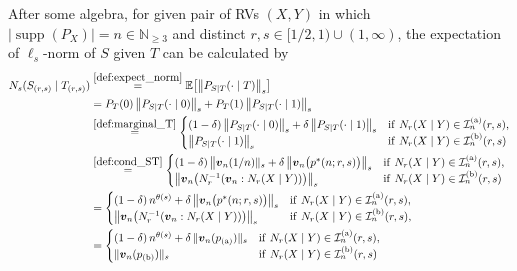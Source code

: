 \documentclass[conference, draftcls, onecolumn]{IEEEtran}
\theoremstyle{plain}
\newcommand{\bvec}[1]{\boldsymbol{#1}}
\newcommand{\supp}{\operatorname{supp}}
\begin{document}
After some algebra, for given pair of RVs $(X, Y)$ in which $|\!\supp( P_{X} )| = n \in \mathbb{N}_{\ge 3}$ and distinct $r, s \in [1/2, 1) \cup (1, \infty)$, the expectation of $\ell_{s}$-norm of $S$ given $T$ can be calculated by
\begin{align}
N_{s}(S_{(r, s)} \mid T_{(r, s)})
& \overset{\eqref{def:expect_norm}}{=}
\mathbb{E}\big[ \big\| P_{S|T}(\cdot \mid T) \big\|_{s} \big]
\\
& =
P_{T}( 0 ) \, \big\| P_{S|T}(\cdot \mid 0) \big\|_{s} + P_{T}( 1 ) \, \big\| P_{S|T}(\cdot \mid 1) \big\|_{s}
\\
& \overset{\eqref{def:marginal_T}}{=}
\begin{cases}
(1-\delta) \, \big\| P_{S|T}(\cdot \mid 0) \big\|_{s} + \delta \, \big\| P_{S|T}(\cdot \mid 1) \big\|_{s}
& \mathrm{if} \ N_{r}(X \mid Y) \in \mathcal{I}_{n}^{(\mathrm{a})}( r, s ) ,
\\
\big\| P_{S|T}(\cdot \mid 1) \big\|_{s}
& \mathrm{if} \ N_{r}(X \mid Y) \in \mathcal{I}_{n}^{(\mathrm{b})}( r, s )
\end{cases}
\\
& \overset{\eqref{def:cond_ST}}{=}
\begin{cases}
(1-\delta) \, \big\| \bvec{v}_{n}(1/n) \|_{s} + \delta \, \big\| \bvec{v}_{n}\big( p^{\ast}(n; r, s) \big) \big\|_{s}
& \mathrm{if} \ N_{r}(X \mid Y) \in \mathcal{I}_{n}^{(\mathrm{a})}( r, s ) ,
\\
\big\| \bvec{v}_{n}\big( N_{r}^{-1}( \bvec{v}_{n} : N_{r}(X \mid Y) ) \big) \big\|_{s}
& \mathrm{if} \ N_{r}(X \mid Y) \in \mathcal{I}_{n}^{(\mathrm{b})}( r, s )
\end{cases}
\\
& =
\begin{cases}
(1-\delta) \, n^{\theta( s )} + \delta \, \big\| \bvec{v}_{n}\big( p^{\ast}(n; r, s) \big) \big\|_{s}
& \mathrm{if} \ N_{r}(X \mid Y) \in \mathcal{I}_{n}^{(\mathrm{a})}( r, s ) ,
\\
\big\| \bvec{v}_{n}\big( N_{r}^{-1}( \bvec{v}_{n} : N_{r}(X \mid Y) ) \big) \big\|_{s}
& \mathrm{if} \ N_{r}(X \mid Y) \in \mathcal{I}_{n}^{(\mathrm{b})}( r, s ) ,
\end{cases}
\\
& =
\begin{cases}
(1-\delta) \, n^{\theta( s )} + \delta \, \| \bvec{v}_{n}( p_{(\mathrm{a})} ) \|_{s}
& \mathrm{if} \ N_{r}(X \mid Y) \in \mathcal{I}_{n}^{(\mathrm{a})}( r, s ) ,
\\
\| \bvec{v}_{n}( p_{(\mathrm{b})} ) \|_{s}
& \mathrm{if} \ N_{r}(X \mid Y) \in \mathcal{I}_{n}^{(\mathrm{b})}( r, s )
\end{cases}
\label{eq:norm_ST}
\end{align}
\end{document}
